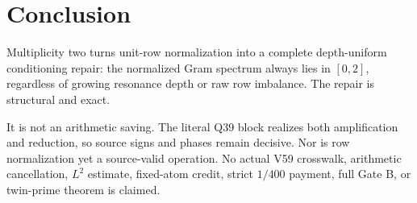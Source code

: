 \section{Conclusion}

Multiplicity two turns unit-row normalization into a complete depth-uniform
conditioning repair: the normalized Gram spectrum always lies in $[0,2]$, regardless
of growing resonance depth or raw row imbalance.  The repair is structural and exact.

It is not an arithmetic saving.  The literal Q39 block realizes both amplification and
reduction, so source signs and phases remain decisive.  Nor is row normalization yet a
source-valid operation.  No actual V59 crosswalk, arithmetic cancellation, $L^2$
estimate, fixed-atom credit, strict $1/400$ payment, full Gate B, or twin-prime theorem
is claimed.
